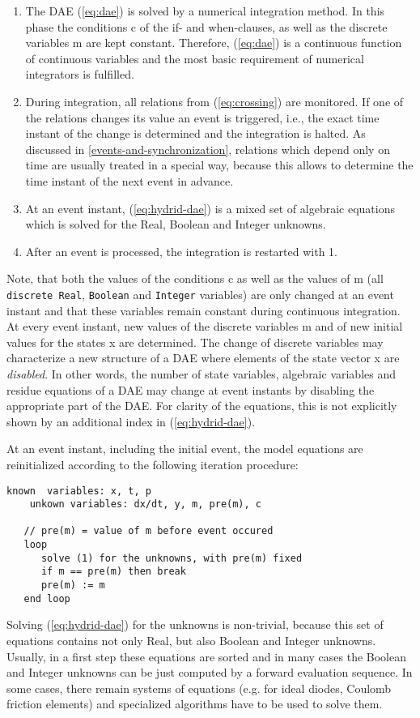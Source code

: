\begin{enumerate}
\item
  The DAE (\ref{eq:dae}) is solved by a numerical integration method. In this
  phase the conditions c of the if- and when-clauses, as well as the
  discrete variables m are kept constant. Therefore, (\ref{eq:dae}) is a
  continuous function of continuous variables and the most basic
  requirement of numerical integrators is fulfilled.
\item
  During integration, all relations from (\ref{eq:crossing}) are monitored. If one of
  the relations changes its value an event is triggered, i.e., the exact
  time instant of the change is determined and the integration is
  halted. As discussed in \autoref{events-and-synchronization}, relations which depend only on
  time are usually treated in a special way, because this allows to
  determine the time instant of the next event in advance.
\item
  At an event instant, (\ref{eq:hydrid-dae}) is a mixed set of algebraic equations which
  is solved for the Real, Boolean and Integer unknowns.
\item
  After an event is processed, the integration is restarted with 1.
\end{enumerate}

Note, that both the values of the conditions c as well as the values of
m (all \lstinline!discrete Real!, \lstinline!Boolean! and \lstinline!Integer! variables) are only changed at
an event instant and that these variables remain constant during
continuous integration. At every event instant, new values of the
discrete variables m and of new initial values for the states x are
determined. The change of discrete variables may characterize a new
structure of a DAE where elements of the state vector x are
\emph{disabled}. In other words, the number of state variables,
algebraic variables and residue equations of a DAE may change at event
instants by disabling the appropriate part of the DAE. For clarity of
the equations, this is not explicitly shown by an additional index in
(\ref{eq:hydrid-dae}).

At an event instant, including the initial event, the model equations
are reinitialized according to the following iteration procedure:

\begin{lstlisting}[language=modelica]
    known  variables: x, t, p
    unkown variables: dx/dt, y, m, pre(m), c

   // pre(m) = value of m before event occured
   loop
      solve (1) for the unknowns, with pre(m) fixed
      if m == pre(m) then break
      pre(m) := m
   end loop
\end{lstlisting}
Solving (\ref{eq:hydrid-dae}) for the unknowns is non-trivial, because this set of
equations contains not only Real, but also Boolean and Integer unknowns.
Usually, in a first step these equations are sorted and in many cases
the Boolean and Integer unknowns can be just computed by a forward
evaluation sequence. In some cases, there remain systems of equations
(e.g. for ideal diodes, Coulomb friction elements) and specialized
algorithms have to be used to solve them.

